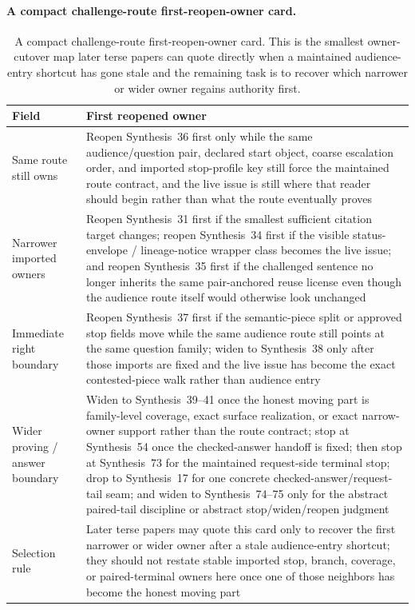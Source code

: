 \documentclass[11pt]{article}
\begin{document}
\paragraph{A compact challenge-route first-reopen-owner card.}
\begin{table}[t]
\centering
\small
\begin{tabularx}{\linewidth}{@{}lX@{}}
\toprule
Field & First reopened owner \\
\midrule
Same route still owns & Reopen Synthesis~36 first only while the same audience/question pair, declared start object, coarse escalation order, and imported stop-profile key still force the maintained route contract, and the live issue is still where that reader should begin rather than what the route eventually proves \\
Narrower imported owners & Reopen Synthesis~31 first if the smallest sufficient citation target changes; reopen Synthesis~34 first if the visible status-envelope / lineage-notice wrapper class becomes the live issue; and reopen Synthesis~35 first if the challenged sentence no longer inherits the same pair-anchored reuse license even though the audience route itself would otherwise look unchanged \\
Immediate right boundary & Reopen Synthesis~37 first if the semantic-piece split or approved stop fields move while the same audience route still points at the same question family; widen to Synthesis~38 only after those imports are fixed and the live issue has become the exact contested-piece walk rather than audience entry \\
Wider proving / answer boundary & Widen to Synthesis~39--41 once the honest moving part is family-level coverage, exact surface realization, or exact narrow-owner support rather than the route contract; stop at Synthesis~54 once the checked-answer handoff is fixed; then stop at Synthesis~73 for the maintained request-side terminal stop; drop to Synthesis~17 for one concrete checked-answer/request-tail seam; and widen to Synthesis~74--75 only for the abstract paired-tail discipline or abstract stop/widen/reopen judgment \\
Selection rule & Later terse papers may quote this card only to recover the first narrower or wider owner after a stale audience-entry shortcut; they should not restate stable imported stop, branch, coverage, or paired-terminal owners here once one of those neighbors has become the honest moving part \\
\bottomrule
\end{tabularx}
\caption{A compact challenge-route first-reopen-owner card. This is the smallest owner-cutover map later terse papers can quote directly when a maintained audience-entry shortcut has gone stale and the remaining task is to recover which narrower or wider owner regains authority first.}
\label{tab:challenge-route-first-reopen-owner-card}
\end{table}
\end{document}
